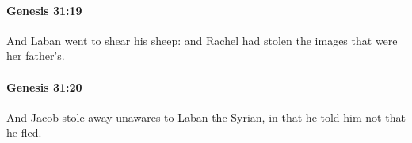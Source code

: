 		\paragraph{Genesis 31:19} %
			\label{GENESIS-31-19}

			And Laban went to shear his sheep: and Rachel had stolen the images that were her father's.


		\paragraph{Genesis 31:20} %
			\label{GENESIS-31-20}

			And Jacob stole away unawares to Laban the Syrian, in that he told him not that he fled.


